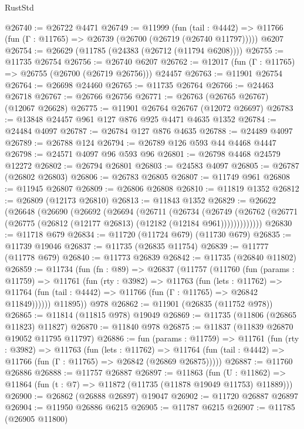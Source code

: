 \begin{lexlean}{RustStd}
\begin{coremodule}
@26740 := @26722 @4471
@26749 := @11999
    (fun (tail : @4442) => @11766 (fun (Γ : @11765) => @26739 (@26700 (@26719 (@26740 @11797)))))
    @6207
@26754 := @26629 (@11785 (@24383 (@26712 (@11794 @6208))))
@26755 := @11735 @26754
@26756 := @26740 @6207
@26762 := @12017 (fun (Γ : @11765) => @26755 (@26700 (@26719 @26756))) @24457
@26763 := @11901 @26754
@26764 := @26698 @24460
@26765 := @11735 @26764
@26766 := @24463 @26718
@26767 := @26766 @26756
@26771 := @26763 (@26765 @26767) (@12067 @26628)
@26775 := @11901 @26764 @26767 (@12072 @26697)
@26783 := @13848 @24457 @961 @127 @876 @925 @4471 @4635 @1352
@26784 := @24484 @4097
@26787 := @26784 @127 @876 @4635
@26788 := @24489 @4097
@26789 := @26788 @124
@26794 := @26789 @126 @593 @44 @4468 @4447
@26798 := @24571 @4097 @96 @593 @96
@26801 := @26798 @4468 @24579 @12272
@26802 := @26794 @26801
@26803 := @24583 @4097
@26805 := @26787 (@26802 @26803)
@26806 := @26783 @26805
@26807 := @11749 @961
@26808 := @11945 @26807
@26809 := @26806 @26808
@26810 := @11819 @1352
@26812 := @26809 (@12173 @26810)
@26813 := @11843 @1352
@26829 := @26622
    (@26648
      (@26690
        (@26692
          (@26694
            (@26711
              (@26734
                (@26749
                  (@26762 (@26771 (@26775 (@26812 (@12177 @26813) (@12182 (@12184 @961)))))))))))))
@26830 := @11718 @679
@26834 := @11720 (@11724 @679) (@11730 @679)
@26835 := @11739 @19046
@26837 := @11735 (@26835 @11754)
@26839 := @11777 (@11778 @679)
@26840 := @11773 @26839
@26842 := @11735 (@26840 @11802)
@26859 := @11734
    (fun (fn : @89) =>
    @26837
      (@11757
        (@11760
          (fun (params : @11759) =>
          @11761
            (fun (rty : @3982) =>
            @11763
              (fun (lets : @11762) =>
              @11764 (fun (tail : @4442) => @11766 (fun (Γ : @11765) => @26842 @11849))))))
        @11895))
    @978
@26862 := @11901 (@26835 (@11752 @978))
@26865 := @11814 (@11815 @978) @19049
@26869 := @11735 (@11806 (@26865 @11823) @11827)
@26870 := @11840 @978
@26875 := @11837 (@11839 @26870 @19052 @11795 @11797)
@26886 := fun (params : @11759) =>
  @11761
    (fun (rty : @3982) =>
    @11763
      (fun (lets : @11762) =>
      @11764 (fun (tail : @4442) => @11766 (fun (Γ : @11765) => @26842 (@26869 @26875)))))
@26887 := @11760 @26886
@26888 := @11757 @26887
@26897 := @11863
    (fun (U : @11862) => @11864 (fun (t : @7) => @11872 (@11735 (@11878 @19049 @11753) @11889)))
@26900 := @26862 (@26888 @26897) @19047
@26902 := @11720 @26887 @26897
@26904 := @11950 @26886 @6215
@26905 := @11787 @6215
@26907 := @11785 (@26905 @11800)

\end{coremodule}
\end{lexlean}
